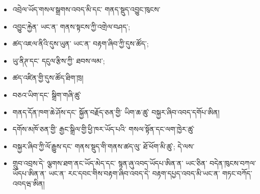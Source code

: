 \documentclass[11pt]{article}
\begin{document}
\begin{itemize}[leftmargin=*]
\item འབྲེལ་ཡོད་གསལ་སྒྲགས་འབད་མི་དང་ གནད་སྡུད་འབྱུང་ཁུངས་
\item འབྱུང་རྐྱེན་ ཡང་ན་ གནས་སྟངས་ཀྱི་འགྲེལ་བཤད་;
\item ཚད་འཇལ་ནིའི་དུས་ཡུན་ ཡང་ན་ བརྟག་ཞིབ་ཀྱི་དུས་ཚོད་;
\item ཡུ་ནིཊ་དང་ དངུལ་རྩིས་ཀྱི་ ཐབས་ལམ་;
\item ཚད་འཛིན་གྱི་དུས་ཚོད་ཐིག་ཁྲ།
\item བཅའ་ཡིག་དང་ སྒྲིག་གཞི་ཚུ་
\item གནད་དོན་ཁག་ཆེ་ཤོས་དང་ སྐྱོན་བརྗོད་ཅན་གྱི་ ཡིག་ཆ་ཚུ་ བསྐྱར་ཞིབ་འབད་དགོཔ་ཨིན།
\item དགོས་མཁོ་ཅན་གྱི་ རྒྱང་སྒྲིལ་གྱི་ཕྱི་ཁར་ཡོད་པའི་ གསལ་སྟོན་དང་ལག་ཁྱེར་ཚུ་
\item བསྐྱར་ཞིབ་ཀྱི་ལོ་རྒྱུས་དང་ གནས་སྡུད་གི་གནས་ཚད་ལུ་ ཐོ་ཕོག་མི་ཚུ་; དེ་ལས་
\item གྲུབ་འབྲས་དེ་ ལྕགས་ཐག་ནང་ཡོད་མེད་དང་ སྙན་ཞུ་འབད་ཡོདཔ་ཨིན་ན་ ཡང་ཅིན་ བདེན་ཁུངས་བཀལ་ཡོདཔ་ཨིན་ན་ ཡང་ན་ རང་དབང་གིས་བརྟག་ཞིབ་འབད་དེ་ བརྟག་དཔྱད་འབད་མི་ཡང་ན་ གཏང་བཀོད་འབདཝ་ཨིན།
\end{itemize}
\end{document}
